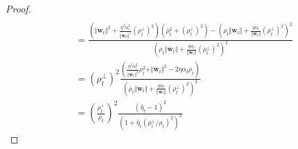 \documentclass[pdflatex,sn-basic]{sn-jnl}%
\theoremstyle{thmstyleone}%
\begin{document}
\begin{appendices}
\begin{proof}
\begin{equation*}
\begin{aligned}
    \\ & = 
    \frac{\left(
      \Vert \mathbf{w}_{t} \Vert^2
      + 
      \frac{\eta^2 \alpha_t^2}{\Vert \mathbf{w}_{t} \Vert^2} \left(\rho_t^{\perp}\right)^2
    \right) \left(\rho_t^2 + \left(\rho_t^{\perp}\right)^2\right) - 
    \left(    \rho_t \Vert \mathbf{w}_t \Vert
    +
    \frac{\eta \alpha_t}{\Vert \mathbf{w}_{t} \Vert} \left( \rho_t^{\perp} \right)^2\right)^2}
    {
      \left(    \rho_t \Vert \mathbf{w}_t \Vert
    +
    \frac{\eta \alpha_t}{\Vert \mathbf{w}_{t} \Vert} \left( \rho_t^{\perp} \right)^2\right)^2}
    \\ & = 
    \left(\rho_t^{\perp}\right)^2
    \frac{
      \left(
        \frac{\eta^2 \alpha_t^2}{\Vert \mathbf{w}_t \Vert^2} \rho_t^2 
        +
        \Vert \mathbf{w}_t \Vert^2  
        - 
        2 \eta \alpha_t \rho_t  
      \right)
    }{
      \left(    \rho_t \Vert \mathbf{w}_t \Vert
    +
    \frac{\eta \alpha_t}{\Vert \mathbf{w}_{t} \Vert} \left( \rho_t^{\perp} \right)^2\right)^2
    }
    \\ & = 
    \left(\frac{\rho_t^{\perp}}{\rho_t}\right)^2
    \frac{
      \left(
        \hat{\eta}_t - 1
      \right)^2
    }{
      \left( 1
    +
    \hat{\eta}_t \left( \rho_t^{\perp} / \rho_t\right)^2\right)^2
    }
  \end{aligned}
  \end{equation*}


\end{proof}
\end{appendices}
\end{document}
